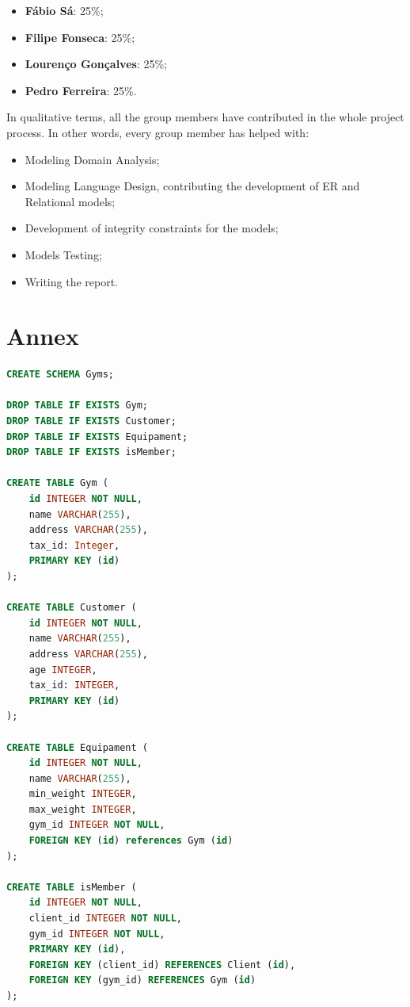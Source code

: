 \documentclass[10pt]{article}
\begin{document}
\begin{itemize}

    \item \textbf{Fábio Sá}: 25\%;

    \item \textbf{Filipe Fonseca}: 25\%;
    
    \item \textbf{Lourenço Gonçalves}: 25\%;
    
    \item \textbf{Pedro Ferreira}: 25\%.
    
\end{itemize}

In qualitative terms, all the group members have contributed in the whole project process. In other words, every group member has helped with:

\begin{itemize}

    \item Modeling Domain Analysis;

    \item Modeling Language Design, contributing the development of ER and Relational models;

    \item Development of integrity constraints for the models;
    
    \item Models Testing;
    
    \item Writing the report.
    
\end{itemize}




\newpage
\appendix 

\section{Annex} \label{Annex1}

\begin{lstlisting}[language=SQL]
CREATE SCHEMA Gyms;

DROP TABLE IF EXISTS Gym;
DROP TABLE IF EXISTS Customer;
DROP TABLE IF EXISTS Equipament;
DROP TABLE IF EXISTS isMember;

CREATE TABLE Gym (
    id INTEGER NOT NULL,
    name VARCHAR(255),
    address VARCHAR(255),
    tax_id: Integer,
    PRIMARY KEY (id)
);

CREATE TABLE Customer (
    id INTEGER NOT NULL,
    name VARCHAR(255),
    address VARCHAR(255),
    age INTEGER,
    tax_id: INTEGER,
    PRIMARY KEY (id) 
);

CREATE TABLE Equipament (
    id INTEGER NOT NULL,
    name VARCHAR(255),
    min_weight INTEGER,
    max_weight INTEGER,
    gym_id INTEGER NOT NULL,
    FOREIGN KEY (id) references Gym (id)
);

CREATE TABLE isMember (
    id INTEGER NOT NULL,
    client_id INTEGER NOT NULL,
    gym_id INTEGER NOT NULL,
    PRIMARY KEY (id),
    FOREIGN KEY (client_id) REFERENCES Client (id),
    FOREIGN KEY (gym_id) REFERENCES Gym (id)
);
\end{lstlisting}
\end{document}
